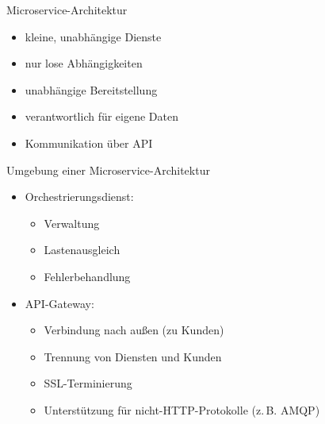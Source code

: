 

\begin{flashcard}[]{Microservice-Architektur}
  \begin{itemize}
    \item kleine, unabhängige Dienste
    \item nur lose Abhängigkeiten
    \item unabhängige Bereitstellung
    \item verantwortlich für eigene Daten
    \item Kommunikation über API
  \end{itemize}
\end{flashcard}

\begin{flashcard}[]{Umgebung einer Microservice-Architektur}
  \begin{itemize}
    \item Orchestrierungsdienst:
      \begin{itemize}
        \item Verwaltung
        \item Lastenausgleich
        \item Fehlerbehandlung
      \end{itemize}
    \item API-Gateway:\newline
      \begin{itemize}
        \item Verbindung nach außen (zu Kunden)
        \item Trennung von Diensten und Kunden
        \item SSL-Terminierung
        \item Unterstützung für nicht-HTTP-Protokolle (z.\,B. AMQP)
      \end{itemize}
  \end{itemize}
\end{flashcard}

